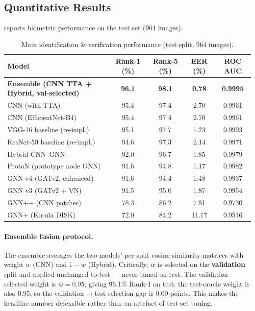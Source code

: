 \documentclass[11pt]{article}
\begin{document}
\subsection{Quantitative Results}\label{sec:main}
 reports biometric performance on the test set (964 images).

\begin{table}[t]
  \centering
  \caption{Main identification \& verification performance (test split, 964 images).}
  \label{tab:main}
  \small
  \begin{tabular}{lcccc}
    \toprule
    Model & Rank-1 (\%) & Rank-5 (\%) & EER (\%) & ROC AUC \\
    \midrule
    \textbf{Ensemble (CNN TTA + Hybrid, val-selected)} & \textbf{96.1} & \textbf{98.1} & \textbf{0.78} & \textbf{0.9995} \\
    CNN (with TTA)                 & 95.4 & 97.4 & 2.70 & 0.9961 \\
    CNN (EfficientNet-B4)          & 95.4 & 97.4 & 2.70 & 0.9961 \\
    VGG-16 baseline (re-impl.)     & 95.1 & 97.7 & 1.23 & 0.9993 \\
    ResNet-50 baseline (re-impl.)  & 94.6 & 97.3 & 2.14 & 0.9971 \\
    Hybrid CNN--GNN                & 92.0 & 96.7 & 1.85 & 0.9979 \\
    ProtoN (prototype node GNN)    & 91.6 & 94.8 & 1.17 & 0.9982 \\
    GNN v4 (GATv2, enhanced)       & 91.6 & 94.4 & 1.48 & 0.9937 \\
    GNN v3 (GATv2 + VN)            & 91.5 & 95.0 & 1.87 & 0.9954 \\
    GNN++ (CNN patches)            & 78.3 & 86.2 & 7.81 & 0.9730 \\
    GNN+ (Kornia DISK)             & 72.0 & 84.2 & 11.17 & 0.9516 \\
    \bottomrule
  \end{tabular}
\end{table}

\paragraph{Ensemble fusion protocol.}
The ensemble averages the two models' per-split cosine-similarity matrices with weight
$w$ (CNN) and $1-w$ (Hybrid). Critically, $w$ is selected on the \textbf{validation} split
and applied unchanged to test --- never tuned on test. The validation-selected weight is
$w=0.95$, giving 96.1\% Rank-1 on test; the test-oracle weight is also 0.95, so the
validation$\to$test selection gap is 0.00 points. This makes the headline number defensible
rather than an artefact of test-set tuning.
\end{document}
